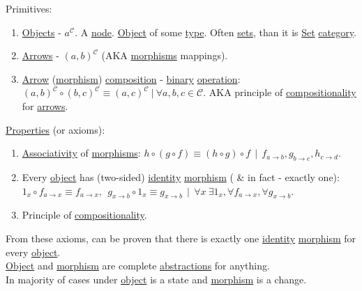 \documentclass[a4paper,14pt,oneside]{book}
\begin{document}
Primitives:\\
\begin{enumerate}
\item \hyperref[orgd42a7f2]{Objects} - \(a^{\mathcal{C}}\). A \hyperref[org910601d]{node}. \hyperref[orgef6fa9d]{Object} of some \hyperref[orgc4a7610]{type}. Often \hyperref[org72aaee3]{sets}, than it is \hyperref[org0f7f8fa]{Set} \hyperref[orgc2c97e7]{category}.\\
\item \hyperref[orge3fa7c8]{Arrows} - \({(a,b)}^{\mathcal{C}}\) (AKA \hyperref[org877a4d9]{morphisms} mappings).\\
\item \hyperref[orgc93956a]{Arrow} (\hyperref[org5a7c2d8]{morphism}) \hyperref[orgcf7d368]{composition} - \hyperref[org969957a]{binary} \hyperref[org894d189]{operation}: \({(a, b)}^{\mathcal{C}} \circ {(b, c)}^{\mathcal{C}} \equiv {(a, c)}^{\mathcal{C}} \ | \ \forall a, b, c \in \mathcal{C}\). AKA principle of \hyperref[org34450c4]{compositionality} for \hyperref[orge3fa7c8]{arrows}.\\
\end{enumerate}

\hyperref[orgbcfea7d]{Properties} (or axioms):\\
\begin{enumerate}
\item \hyperref[org945eafa]{Associativity} of \hyperref[org877a4d9]{morphisms}: \({h} \circ ({g} \circ {f}) \equiv ({h} \circ {g}) \circ {f} \ \ | \ \ {f}_{a \to b}, {g}_{b \to c}, {h}_{c \to d}\).\\
\item Every \hyperref[orgef6fa9d]{object} has (two-sided) \hyperref[org5b82aa1]{identity} \hyperref[org5a7c2d8]{morphism} ( \& in fact - exactly one): \({1}_x \circ {f}_{a \to x} \equiv {f}_{a \to x}, \ \ {g}_{x \to b} \circ {1_x} \equiv {g}_{x \to b } \ \ | \ \ \forall x \ \exists {1}_{x}, \forall {f}_{a \to x},  \forall {g}_{x \to b}\).\\
\item Principle of \hyperref[org34450c4]{compositionality}.\\
\end{enumerate}

From these axioms, can be proven that there is exactly one \hyperref[org5b82aa1]{identity} \hyperref[org5a7c2d8]{morphism} for every \hyperref[orgef6fa9d]{object}.\\

\hyperref[orgef6fa9d]{Object} and \hyperref[org5a7c2d8]{morphism} are complete \hyperref[org122094e]{abstractions} for anything.\\
In majority of cases under \hyperref[orgef6fa9d]{object} is a state and \hyperref[org5a7c2d8]{morphism} is a change.\\
\end{document}
